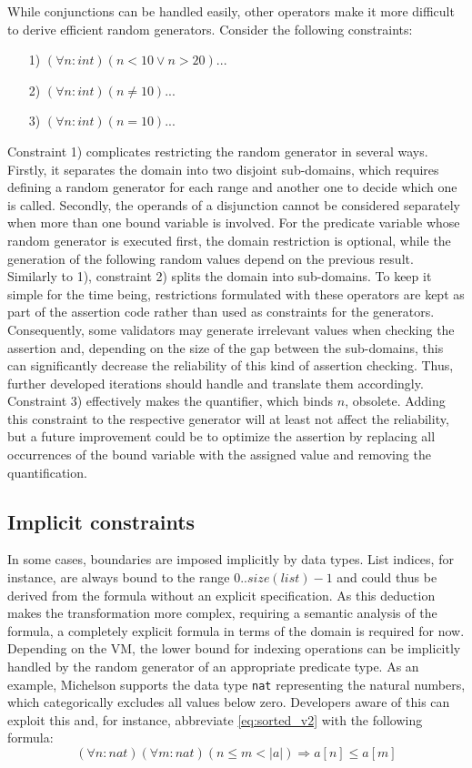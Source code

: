 While conjunctions can be handled easily, other operators make it more difficult to derive efficient random generators. Consider the following constraints:
\begin{itemize}
\itemsep-0.7em
\item[1)] $(\forall n : int) (n < 10 \lor n > 20) ...$
\item[2)] $(\forall n : int) (n \ne 10) ...$
\item[3)] $(\forall n : int) (n = 10) ...$
\end{itemize}
Constraint 1) complicates restricting the random generator in several ways. Firstly, it separates the domain into two disjoint sub-domains, which requires defining a random generator for each range and another one to decide which one is called. Secondly, the operands of a disjunction cannot be considered separately when more than one bound variable is involved. For the predicate variable whose random generator is executed first, the domain restriction is optional, while the generation of the following random values depend on the previous result. Similarly to 1), constraint 2) splits the domain into sub-domains. To keep it simple for the time being, restrictions formulated with these operators are kept as part of the assertion code rather than used as constraints for the generators. Consequently, some validators may generate irrelevant values when checking the assertion and, depending on the size of the gap between the sub-domains, this can significantly decrease the reliability of this kind of assertion checking. Thus, further developed iterations should handle and translate them accordingly.\\
Constraint 3) effectively makes the quantifier, which binds $n$, obsolete. Adding this constraint to the respective generator will at least not affect the reliability, but a future improvement could be to optimize the assertion by replacing all occurrences of the bound variable with the assigned value and removing the quantification.

\subsection{Implicit constraints}
In some cases, boundaries are imposed implicitly by data types. List indices, for instance, are always bound to the range $0.. size(list) - 1$ and could thus be derived from the formula without an explicit specification. As this deduction makes the transformation more complex, requiring a semantic analysis of the formula, a completely explicit formula in terms of the domain is required for now. Depending on the VM, the lower bound for indexing operations can be implicitly handled by the random generator of an appropriate predicate type. As an example, Michelson supports the data type \texttt{nat} representing the natural numbers, which categorically excludes all values below zero. Developers aware of this can exploit this and, for instance, abbreviate \eqref{eq:sorted_v2} with the following formula:
\begin{equation}\label{eq:sorted_v2_abbr}
	(\forall n : nat)(\forall m : nat) (n \le m < |a|) \Rightarrow a[n] \leq a[m]
\end{equation}

